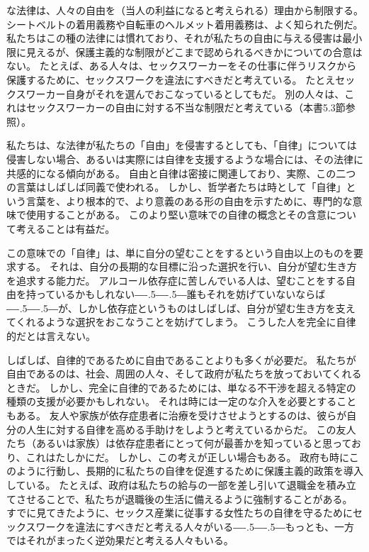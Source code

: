 \documentclass[paper=a4,book,openany]{jlreq}
\def\DDASH{―\kern-.5\zw―\kern-.5\zw―} %
\begin{document}
な法律は、人々の自由を（当人の利益になると考えられる）理由から制限する。
シートベルトの着用義務や自転車のヘルメット着用義務は、よく知られた例だ。
私たちはこの種の法律には慣れており、それが私たちの自由に与える侵害は最小限に見えるが、保護主義的な制限がどこまで認められるべきかについての合意はない。
たとえば、ある人々は、セックスワーカーをその仕事に伴うリスクから保護するために、セックスワークを違法にすべきだと考えている。
たとえセックスワーカー自身がそれを選んでおこなっているとしてもだ。
別の人々は、これはセックスワーカーの自由に対する不当な制限だと考えている（本書5.3節参照）。

私たちは、な法律が私たちの「自由」を侵害するとしても、「自律」については侵害しない場合、あるいは実際には自律を支援するような場合には、その法律に共感的になる傾向がある。
自由と自律は密接に関連しており、実際、この二つの言葉はしばしば同義で使われる。
しかし、哲学者たちは時として「自律」という言葉を、より根本的で、より意義のある形の自由を示すために、専門的な意味で使用することがある。
このより堅い意味での自律の概念とその含意について考えることは有益だ。

この意味での「自律」は、単に自分の望むことをするという自由以上のものを要求する。
それは、自分の長期的な目標に沿った選択を行い、自分が望む生き方を追求する能力だ。
アルコール依存症に苦しんでいる人は、望むことをする自由を持っているかもしれない{\DDASH}誰もそれを妨げていないならば{\DDASH}が、しかし依存症というものはしばしば、自分が望む生き方を支えてくれるような選択をおこなうことを妨げてしまう。
こうした人を完全に自律的だとは言えない。

しばしば、自律的であるために自由であることよりも多くが必要だ。
私たちが自由であるのは、社会、周囲の人々、そして政府が私たちを放っておいてくれるときだ。
しかし、完全に自律的であるためには、単なる不干渉を超える特定の種類の支援が必要かもしれない。
それは時には一定のな介入を必要とすることもある。
友人や家族が依存症患者に治療を受けさせようとするのは、彼らが自分の人生に対する自律を高める手助けをしようと考えているからだ。
この友人たち（あるいは家族）は依存症患者にとって何が最善かを知っていると思っており、これはたしかにだ。
しかし、この考えが正しい場合もある。
政府も時にこのように行動し、長期的に私たちの自律を促進するために保護主義的政策を導入している。
たとえば、政府は私たちの給与の一部を差し引いて退職金を積み立てさせることで、私たちが退職後の生活に備えるように強制することがある。
すでに見てきたように、セックス産業に従事する女性たちの自律を守るためにセックスワークを違法にすべきだと考える人々がいる{\DDASH}もっとも、一方ではそれがまったく逆効果だと考える人々もいる。
\end{document}
